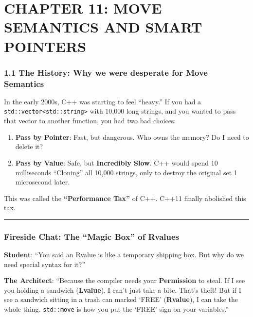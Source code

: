 \hypertarget{chapter-11-move-semantics-and-smart-pointers}{%
\section{CHAPTER 11: MOVE SEMANTICS AND SMART
POINTERS}\label{chapter-11-move-semantics-and-smart-pointers}}

\hypertarget{the-history-why-we-were-desperate-for-move-semantics}{%
\subsubsection{1.1 The History: Why we were desperate for Move
Semantics}\label{the-history-why-we-were-desperate-for-move-semantics}}

In the early 2000s, C++ was starting to feel ``heavy.'' If you had a
\passthrough{\lstinline!std::vector<std::string>!} with 10,000 long
strings, and you wanted to pass that vector to another function, you had
two bad choices:

\begin{enumerate}
\def\labelenumi{\arabic{enumi}.}
\tightlist
\item
  \textbf{Pass by Pointer}: Fast, but dangerous. Who owns the memory? Do
  I need to delete it?
\item
  \textbf{Pass by Value}: Safe, but \textbf{Incredibly Slow}. C++ would
  spend 10 milliseconds ``Cloning'' all 10,000 strings, only to destroy
  the original set 1 microsecond later.
\end{enumerate}

This was called the \textbf{``Performance Tax''} of C++. C++11 finally
abolished this tax.

\begin{center}\rule{0.5\linewidth}{0.5pt}\end{center}

\hypertarget{fireside-chat-the-magic-box-of-rvalues}{%
\subsubsection{Fireside Chat: The ``Magic Box'' of
Rvalues}\label{fireside-chat-the-magic-box-of-rvalues}}

\textbf{Student}: ``You said an Rvalue is like a temporary shipping box.
But why do we need special syntax for it?''

\textbf{The Architect}: ``Because the compiler needs your
\textbf{Permission} to steal. If I see you holding a sandwich
(\textbf{Lvalue}), I can't just take a bite. That's theft! But if I see
a sandwich sitting in a trash can marked `FREE' (\textbf{Rvalue}), I can
take the whole thing. \passthrough{\lstinline!std::move!} is how you put
the `FREE' sign on your variables.''

